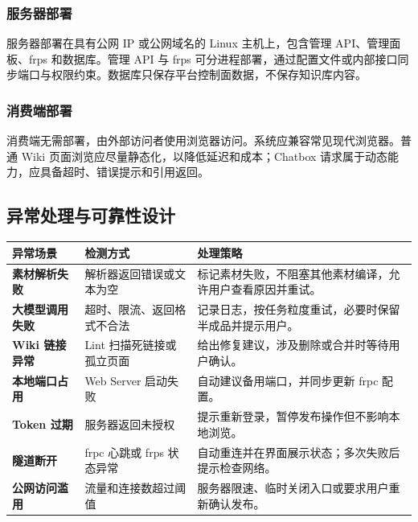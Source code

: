 \documentclass[UTF8,a4paper,12pt,fontset=fandol]{ctexart}
\begin{document}
\subsubsection{服务器部署}
服务器部署在具有公网 IP 或公网域名的 Linux 主机上，包含管理 API、管理面板、frps 和数据库。管理 API 与 frps 可分进程部署，通过配置文件或内部接口同步端口与权限约束。数据库只保存平台控制面数据，不保存知识库内容。

\subsubsection{消费端部署}
消费端无需部署，由外部访问者使用浏览器访问。系统应兼容常见现代浏览器。普通 Wiki 页面浏览应尽量静态化，以降低延迟和成本；Chatbox 请求属于动态能力，应具备超时、错误提示和引用返回。

\subsection{异常处理与可靠性设计}
\begin{longtable}{>{\bfseries}p{3.3cm}p{5.0cm}p{5.8cm}}
\toprule
异常场景 & 检测方式 & 处理策略 \\
\midrule
素材解析失败 & 解析器返回错误或文本为空 & 标记素材失败，不阻塞其他素材编译，允许用户查看原因并重试。 \\
大模型调用失败 & 超时、限流、返回格式不合法 & 记录日志，按任务粒度重试，必要时保留半成品并提示用户。 \\
Wiki 链接异常 & Lint 扫描死链接或孤立页面 & 给出修复建议，涉及删除或合并时等待用户确认。 \\
本地端口占用 & Web Server 启动失败 & 自动建议备用端口，并同步更新 frpc 配置。 \\
Token 过期 & 服务器返回未授权 & 提示重新登录，暂停发布操作但不影响本地浏览。 \\
隧道断开 & frpc 心跳或 frps 状态异常 & 自动重连并在界面展示状态；多次失败后提示检查网络。 \\
公网访问滥用 & 流量和连接数超过阈值 & 服务器限速、临时关闭入口或要求用户重新确认发布。 \\
\bottomrule
\end{longtable}
\end{document}
